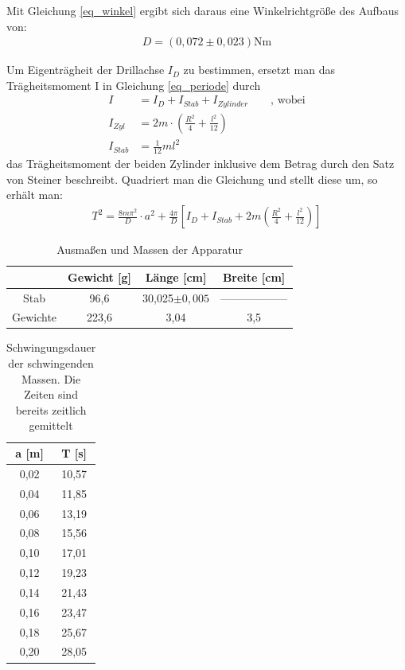 Mit Gleichung \eqref{eq_winkel} ergibt sich daraus eine Winkelrichtgröße des Aufbaus von:
\begin{align*}
D=(0,072 \pm0,023) \text{Nm}
\end{align*}


Um Eigenträgheit der Drillachse $I_D$ zu bestimmen, ersetzt man das Trägheitsmoment I in Gleichung \eqref{eq_periode} durch
\begin{align*}
I&=I_D+I_{Stab}+I_{Zylinder} \qquad \text{, wobei}\\
I_{Zyl}&=2m\cdot\left(\frac{R^2}{4}+\frac{l^2}{12}\right)\\
I_{Stab}&= \frac{1}{12}ml^2
\end{align*}
das Trägheitsmoment der beiden Zylinder inklusive dem Betrag durch den Satz von Steiner beschreibt.
Quadriert man die Gleichung und stellt diese um, so erhält man:
\begin{align}
T^2=\frac{8m\pi^2}{D}\cdot a^2 + \frac{4\pi}{D}  \left[  I_D+I_{Stab}+2m\left(\frac{R^2}{4}+\frac{l^2}{12}\right)\right]
\end{align}

\begin{table}[htbp]
\begin{tabular}{|c|c|c|c|}
\hline 
 & Gewicht [g] & Länge [cm] & Breite [cm] \\ 
\hline 
Stab & 96,6 & 30,025$\pm 0,005$ & ------------------ \\ 
\hline 
Gewichte & 223,6 & 3,04 & 3,5 \\ 
\hline 
\end{tabular}\newline
\caption{Ausmaßen und Massen der Apparatur}
\end{table}

\begin{table}[htbp]
\begin{tabular}{|c|c|}
\hline
a [m] &	T [s]\\ \hline
0,02&	10,57\\ \hline
0,04&	11,85\\ \hline
0,06&	13,19\\ \hline
0,08&	15,56\\ \hline
0,10&	17,01\\ \hline
0,12&	19,23\\ \hline
0,14&	21,43\\ \hline
0,16&	23,47\\ \hline
0,18&	25,67\\ \hline
0,20&	28,05\\ \hline
\end{tabular} 
\caption{Schwingungsdauer der schwingenden Massen. Die Zeiten sind bereits zeitlich gemittelt}
\end{table}

